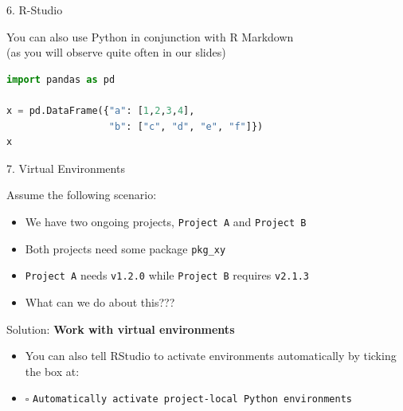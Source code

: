 
\begin{vbframe}{6. R-Studio}

\vfill

You can also use Python in conjunction with R Markdown\\
(as you will observe quite often in our slides)

\begin{lstlisting}[language=python]
import pandas as pd

x = pd.DataFrame({"a": [1,2,3,4],
                  "b": ["c", "d", "e", "f"]})
x
\end{lstlisting}

\vfill

\end{vbframe}


\begin{vbframe}{7. Virtual Environments}

\vfill

Assume the following scenario:

\begin{itemize}
	\item We have two ongoing projects, \texttt{Project A} and \texttt{Project B}
	\item Both projects need some package \texttt{pkg\_xy}
	\item \texttt{Project A} needs \texttt{v1.2.0} while \texttt{Project B} requires \texttt{v2.1.3}
	\item What can we do about this???
\end{itemize}

\vspace{.2cm}

Solution: \textbf{Work with virtual environments}

\begin{itemize}
	\item You can also tell RStudio to activate environments automatically by ticking the box at: 
	\item $\square$ \footnotesize \texttt{Automatically activate project-local Python environments}
\end{itemize}

\vfill

\end{vbframe}

